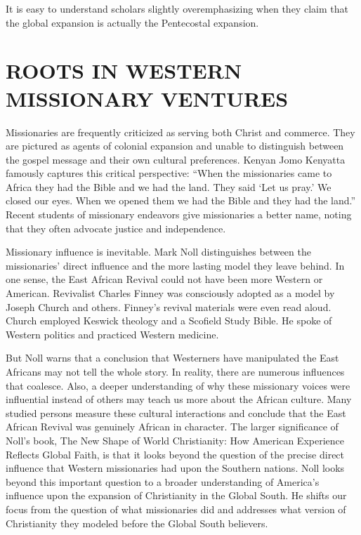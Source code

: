 It is easy to understand scholars slightly overemphasizing when they claim that the global expansion
is actually the Pentecostal expansion.

\section{ROOTS IN WESTERN MISSIONARY VENTURES}

Missionaries are frequently criticized as serving both Christ and commerce. They are pictured as
agents of colonial expansion and unable to distinguish between the gospel message and their own
cultural preferences. Kenyan Jomo Kenyatta famously captures this critical perspective: “When the
missionaries came to Africa they had the Bible and we had the land. They said ‘Let us pray.’ We
closed our eyes. When we opened them we had the Bible and they had the land.” Recent students of
missionary endeavors give missionaries a better name, noting that they often advocate justice and
independence.

Missionary influence is inevitable. Mark Noll distinguishes between the missionaries’ direct
influence and the more lasting model they leave behind. In one sense, the East African Revival could
not have been more Western or American. Revivalist Charles Finney was consciously adopted as a model
by Joseph Church and others. Finney’s revival materials were even read aloud. Church employed
Keswick theology and a Scofield Study Bible. He spoke of Western politics and practiced Western
medicine.

But Noll warns that a conclusion that Westerners have manipulated the East Africans may not tell the
whole story. In reality, there are numerous influences that coalesce. Also, a deeper understanding
of why these missionary voices were influential instead of others may teach us more about the
African culture. Many studied persons measure these cultural interactions and conclude that the East
African Revival was genuinely African in character. The larger significance of Noll’s book, The New
Shape of World Christianity: How American Experience Reflects Global Faith, is that it looks beyond
the question of the precise direct influence that Western missionaries had upon the Southern
nations. Noll looks beyond this important question to a broader understanding of America’s influence
upon the expansion of Christianity in the Global South. He shifts our focus from the question of
what missionaries did and addresses what version of Christianity they modeled before the Global
South believers.

